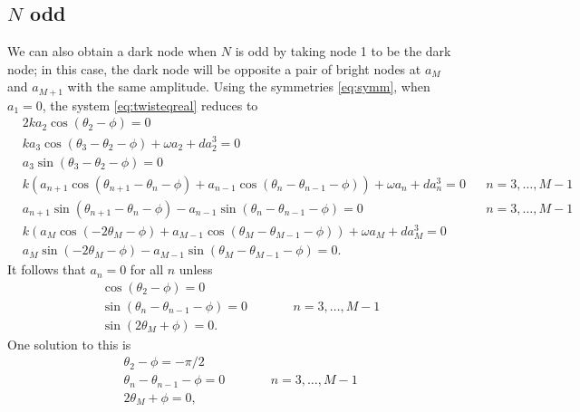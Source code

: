 \documentclass[12pt]{article}
\begin{document}
\subsection{\texorpdfstring{$N$}{N} odd}

We can also obtain a dark node when $N$ is odd by taking node 1 to be the dark node; in this case, the dark node will be opposite a pair of bright nodes at $a_M$ and $a_{M+1}$ with the same amplitude. Using the symmetries \cref{eq:symm}, when $a_1 = 0$, the system \cref{eq:twisteqreal} reduces to 
\begin{equation}\label{eq:twisteqodd}
\begin{aligned}
&2 k a_2 \cos(\theta_2 - \phi) = 0 \\
&k a_3 \cos(\theta_3-\theta_2-\phi) + \omega a_2 + d a_2^3 = 0 \\
&a_3 \sin(\theta_3-\theta_2-\phi) = 0 \\
&k\left( a_{n+1} \cos(\theta_{n+1}-\theta_n-\phi) + a_{n-1} \cos(\theta_n - \theta_{n-1}-\phi)\right) + \omega a_n + d a_n^3 = 0 && n = 3, \dots, M-1 \\
&a_{n+1} \sin(\theta_{n+1}-\theta_n-\phi) - a_{n-1} \sin(\theta_n - \theta_{n-1}-\phi) = 0 && n = 3, \dots, M-1 \\
&k ( a_M \cos(-2 \theta_M - \phi) + a_{M-1} \cos(\theta_M - \theta_{M-1} - \phi)) + \omega a_M + d a_M^3 = 0 \\
& a_M \sin(-2 \theta_M - \phi) - a_{M-1} \sin(\theta_M - \theta_{M-1} - \phi) = 0.
\end{aligned}
\end{equation}
It follows that $a_n = 0$ for all $n$ unless
\begin{equation}\label{eq:odddarknodecond}
\begin{aligned}
&\cos(\theta_2 - \phi) = 0 \\
&\sin(\theta_{n} - \theta_{n-1} - \phi) = 0 && \qquad n = 3, \dots, M-1 \\
&\sin(2 \theta_M + \phi) = 0.
\end{aligned}
\end{equation}
One solution to this is
\begin{equation}\label{eq:odddarknodecond1}
\begin{aligned}
&\theta_2 - \phi = -\pi/2 \\
&\theta_{n} - \theta_{n-1} - \phi = 0 && \qquad n = 3, \dots, M-1 \\
&2 \theta_M + \phi = 0,
\end{aligned}
\end{equation}
\end{document}
